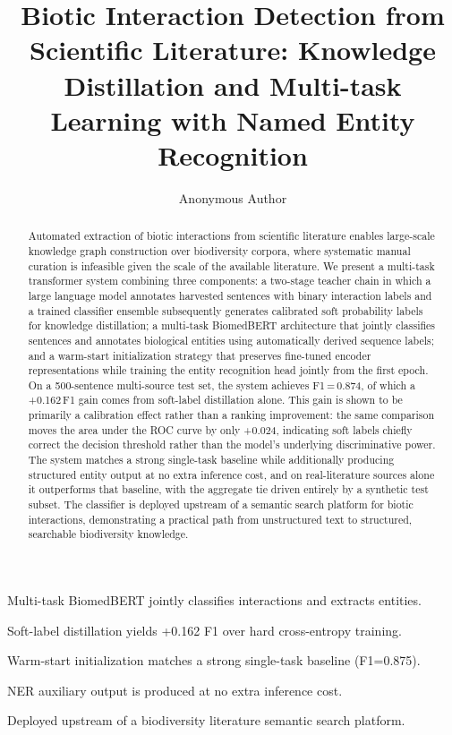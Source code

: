 \documentclass[a4paper,fleqn]{cas-sc}
\begin{document}

\title[mode=title]{Biotic Interaction Detection from Scientific Literature: Knowledge
Distillation and Multi-task Learning with Named Entity Recognition}

\author[1]{Anonymous Author}


\begin{abstract}
Automated extraction of biotic interactions from scientific literature
enables large-scale knowledge graph construction over biodiversity corpora,
where systematic manual curation is infeasible given the scale of the
available literature. We present a multi-task transformer system combining
three components: a two-stage teacher chain in which a large language
model annotates harvested sentences with binary interaction labels and a
trained classifier ensemble subsequently generates calibrated soft
probability labels for knowledge distillation; a multi-task BiomedBERT
architecture that jointly classifies sentences and annotates biological
entities using automatically derived sequence labels; and a warm-start
initialization strategy that preserves fine-tuned encoder representations
while training the entity recognition head jointly from the first epoch.
On a 500-sentence multi-source test set, the system achieves F1\,=\,0.874,
of which a +0.162\,F1 gain comes from soft-label distillation alone. This
gain is shown to be primarily a calibration effect rather than a ranking
improvement: the same comparison moves the area under the ROC curve by
only +0.024, indicating soft labels chiefly correct the decision threshold
rather than the model's underlying discriminative power. The system
matches a strong single-task baseline while additionally producing
structured entity output at no extra inference cost, and on
real-literature sources alone it outperforms that baseline, with the
aggregate tie driven entirely by a synthetic test subset. The classifier
is deployed upstream of a semantic search platform for biotic
interactions, demonstrating a practical path from unstructured text to
structured, searchable biodiversity knowledge.
\end{abstract}

\begin{highlights}
\item Multi-task BiomedBERT jointly classifies interactions and extracts entities.
\item Soft-label distillation yields +0.162 F1 over hard cross-entropy training.
\item Warm-start initialization matches a strong single-task baseline (F1=0.875).
\item NER auxiliary output is produced at no extra inference cost.
\item Deployed upstream of a biodiversity literature semantic search platform.
\end{highlights}
\end{document}
